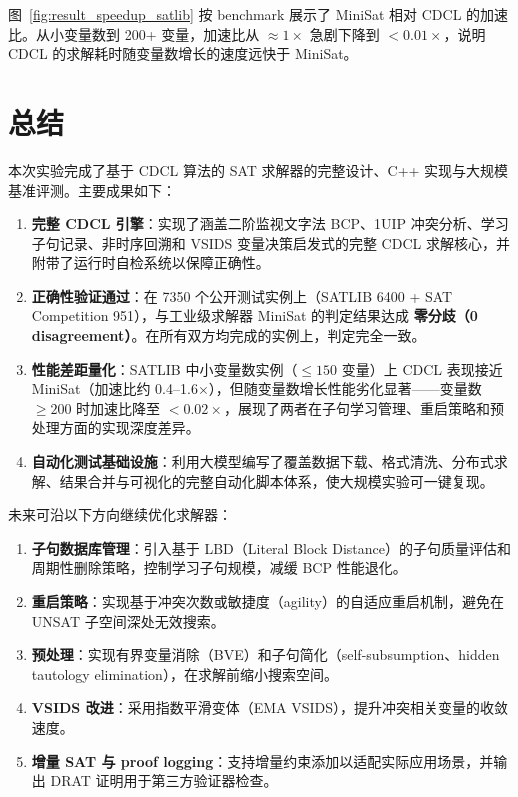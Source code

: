 \documentclass[12pt,a4paper]{article}
\begin{document}
图~\ref{fig:result_speedup_satlib} 按 benchmark 展示了 MiniSat 相对 CDCL 的加速比。从小变量数到 200+ 变量，加速比从 $\approx 1\times$ 急剧下降到 $<0.01\times$，说明 CDCL 的求解耗时随变量数增长的速度远快于 MiniSat。

\section{总结}

本次实验完成了基于 CDCL 算法的 SAT 求解器的完整设计、C++ 实现与大规模基准评测。主要成果如下：

\begin{enumerate}[label=(\arabic*)]
    \item \textbf{完整 CDCL 引擎}：实现了涵盖二阶监视文字法 BCP、1UIP 冲突分析、学习子句记录、非时序回溯和 VSIDS 变量决策启发式的完整 CDCL 求解核心，并附带了运行时自检系统以保障正确性。
    \item \textbf{正确性验证通过}：在 7350 个公开测试实例上（SATLIB 6400 + SAT Competition 951），与工业级求解器 MiniSat 的判定结果达成 \textbf{零分歧（0 disagreement）}。在所有双方均完成的实例上，判定完全一致。
    \item \textbf{性能差距量化}：SATLIB 中小变量数实例（$\leq 150$ 变量）上 CDCL 表现接近 MiniSat（加速比约 0.4--1.6$\times$），但随变量数增长性能劣化显著——变量数 $\geq 200$ 时加速比降至 $<0.02\times$，展现了两者在子句学习管理、重启策略和预处理方面的实现深度差异。
    \item \textbf{自动化测试基础设施}：利用大模型编写了覆盖数据下载、格式清洗、分布式求解、结果合并与可视化的完整自动化脚本体系，使大规模实验可一键复现。
\end{enumerate}

未来可沿以下方向继续优化求解器：

\begin{enumerate}[label=(\arabic*)]
    \item \textbf{子句数据库管理}：引入基于 LBD（Literal Block Distance）的子句质量评估和周期性删除策略，控制学习子句规模，减缓 BCP 性能退化。
    \item \textbf{重启策略}：实现基于冲突次数或敏捷度（agility）的自适应重启机制，避免在 UNSAT 子空间深处无效搜索。
    \item \textbf{预处理}：实现有界变量消除（BVE）和子句简化（self-subsumption、hidden tautology elimination），在求解前缩小搜索空间。
    \item \textbf{VSIDS 改进}：采用指数平滑变体（EMA VSIDS），提升冲突相关变量的收敛速度。
    \item \textbf{增量 SAT 与 proof logging}：支持增量约束添加以适配实际应用场景，并输出 DRAT 证明用于第三方验证器检查。
\end{enumerate}
\end{document}
